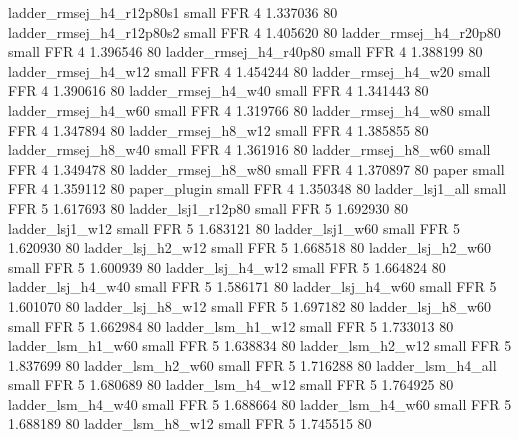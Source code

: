 ladder_rmsej_h4_r12p80s1      small      FFR                 4 1.337036 80
ladder_rmsej_h4_r12p80s2      small      FFR                 4 1.405620 80
  ladder_rmsej_h4_r20p80      small      FFR                 4 1.396546 80
  ladder_rmsej_h4_r40p80      small      FFR                 4 1.388199 80
     ladder_rmsej_h4_w12      small      FFR                 4 1.454244 80
     ladder_rmsej_h4_w20      small      FFR                 4 1.390616 80
     ladder_rmsej_h4_w40      small      FFR                 4 1.341443 80
     ladder_rmsej_h4_w60      small      FFR                 4 1.319766 80
     ladder_rmsej_h4_w80      small      FFR                 4 1.347894 80
     ladder_rmsej_h8_w12      small      FFR                 4 1.385855 80
     ladder_rmsej_h8_w40      small      FFR                 4 1.361916 80
     ladder_rmsej_h8_w60      small      FFR                 4 1.349478 80
     ladder_rmsej_h8_w80      small      FFR                 4 1.370897 80
                   paper      small      FFR                 4 1.359112 80
            paper_plugin      small      FFR                 4 1.350348 80
         ladder_lsj1_all      small      FFR                 5 1.617693 80
      ladder_lsj1_r12p80      small      FFR                 5 1.692930 80
         ladder_lsj1_w12      small      FFR                 5 1.683121 80
         ladder_lsj1_w60      small      FFR                 5 1.620930 80
       ladder_lsj_h2_w12      small      FFR                 5 1.668518 80
       ladder_lsj_h2_w60      small      FFR                 5 1.600939 80
       ladder_lsj_h4_w12      small      FFR                 5 1.664824 80
       ladder_lsj_h4_w40      small      FFR                 5 1.586171 80
       ladder_lsj_h4_w60      small      FFR                 5 1.601070 80
       ladder_lsj_h8_w12      small      FFR                 5 1.697182 80
       ladder_lsj_h8_w60      small      FFR                 5 1.662984 80
       ladder_lsm_h1_w12      small      FFR                 5 1.733013 80
       ladder_lsm_h1_w60      small      FFR                 5 1.638834 80
       ladder_lsm_h2_w12      small      FFR                 5 1.837699 80
       ladder_lsm_h2_w60      small      FFR                 5 1.716288 80
       ladder_lsm_h4_all      small      FFR                 5 1.680689 80
       ladder_lsm_h4_w12      small      FFR                 5 1.764925 80
       ladder_lsm_h4_w40      small      FFR                 5 1.688664 80
       ladder_lsm_h4_w60      small      FFR                 5 1.688189 80
       ladder_lsm_h8_w12      small      FFR                 5 1.745515 80

